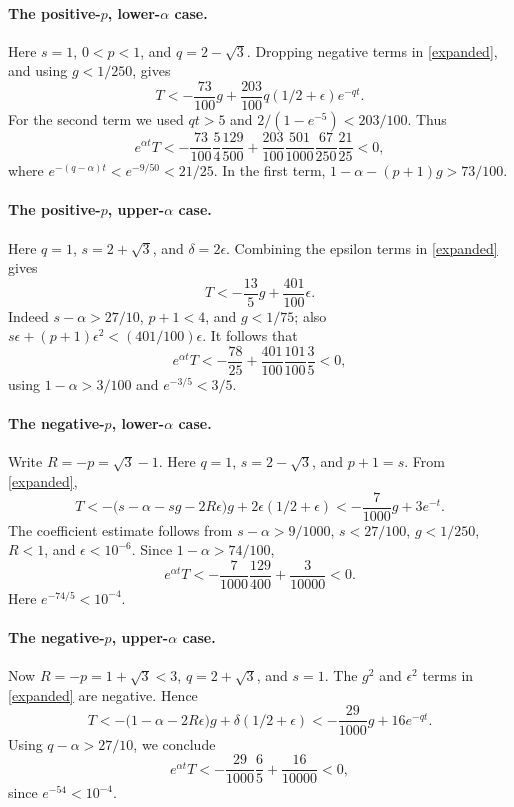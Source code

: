 \documentclass[11pt]{article}
\begin{document}
\paragraph{The positive-\(p\), lower-\(\alpha\) case.}
Here \(s=1\), \(0<p<1\), and \(q=2-\sqrt3\).
Dropping negative terms in \eqref{expanded}, and using
\(g<1/250\), gives
\[
 T<-\frac{73}{100}g+
       \frac{203}{100}q(1/2+\epsilon)e^{-qt}.
\]
For the second term we used \(qt>5\) and
\(2/(1-e^{-5})<203/100\). Thus
\[
 e^{\alpha t}T<
 -\frac{73}{100}\frac54\frac{129}{500}
 +\frac{203}{100}\frac{501}{1000}\frac{67}{250}\frac{21}{25}<0,
\]
where \(e^{-(q-\alpha)t}<e^{-9/50}<21/25\).
In the first term, \(1-\alpha-(p+1)g>73/100\).

\paragraph{The positive-\(p\), upper-\(\alpha\) case.}
Here \(q=1\), \(s=2+\sqrt3\), and \(\delta=2\epsilon\).
Combining the epsilon terms in \eqref{expanded} gives
\[
 T<-\frac{13}{5}g+\frac{401}{100}\epsilon.
\]
Indeed \(s-\alpha>27/10\), \(p+1<4\), and \(g<1/75\);
also \(s\epsilon+(p+1)\epsilon^2<(401/100)\epsilon\).
It follows that
\[
 e^{\alpha t}T<
 -\frac{78}{25}+
 \frac{401}{100}\frac{101}{100}\frac35<0,
\]
using \(1-\alpha>3/100\) and \(e^{-3/5}<3/5\).

\paragraph{The negative-\(p\), lower-\(\alpha\) case.}
Write \(R=-p=\sqrt3-1\). Here \(q=1\), \(s=2-\sqrt3\),
and \(p+1=s\). From \eqref{expanded},
\[
 T<-\bigl(s-\alpha-sg-2R\epsilon\bigr)g
              +2\epsilon(1/2+\epsilon)
 <-\frac7{1000}g+3e^{-t}.
\]
The coefficient estimate follows from \(s-\alpha>9/1000\),
\(s<27/100\), \(g<1/250\), \(R<1\), and
\(\epsilon<10^{-6}\). Since \(1-\alpha>74/100\),
\[
 e^{\alpha t}T<
 -\frac7{1000}\frac{129}{400}+\frac3{10000}<0.
\]
Here \(e^{-74/5}<10^{-4}\).

\paragraph{The negative-\(p\), upper-\(\alpha\) case.}
Now \(R=-p=1+\sqrt3<3\), \(q=2+\sqrt3\), and \(s=1\).
The \(g^2\) and \(\epsilon^2\) terms in \eqref{expanded} are negative.
Hence
\[
 T<-\bigl(1-\alpha-2R\epsilon\bigr)g
              +\delta(1/2+\epsilon)
 <-\frac{29}{1000}g+16e^{-qt}.
\]
Using \(q-\alpha>27/10\), we conclude
\[
 e^{\alpha t}T<
 -\frac{29}{1000}\frac65+\frac{16}{10000}<0,
\]
since \(e^{-54}<10^{-4}\).
\end{document}
